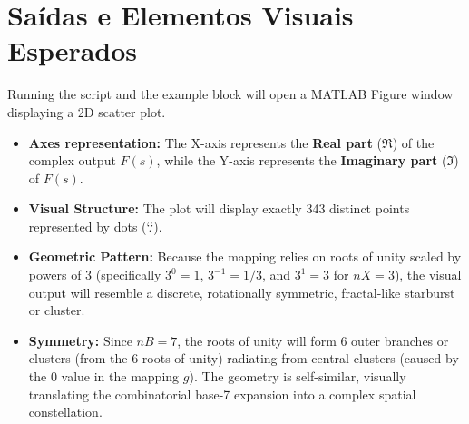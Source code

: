 \section{Saídas e Elementos Visuais Esperados}

Running the script and the example block will open a MATLAB Figure window displaying a 2D scatter plot.

\begin{itemize}
    \item \textbf{Axes representation:} The X-axis represents the \textbf{Real part} ($\Re$) of the complex output $F(s)$, while the Y-axis represents the \textbf{Imaginary part} ($\Im$) of $F(s)$.
    \item \textbf{Visual Structure:} The plot will display exactly 343 distinct points represented by dots (`.`). 
    \item \textbf{Geometric Pattern:} Because the mapping relies on roots of unity scaled by powers of 3 (specifically $3^0=1$, $3^{-1}=1/3$, and $3^1=3$ for $nX=3$), the visual output will resemble a discrete, rotationally symmetric, fractal-like starburst or cluster. 
    \item \textbf{Symmetry:} Since $nB=7$, the roots of unity will form 6 outer branches or clusters (from the 6 roots of unity) radiating from central clusters (caused by the $0$ value in the mapping $g$). The geometry is self-similar, visually translating the combinatorial base-7 expansion into a complex spatial constellation.
\end{itemize}
